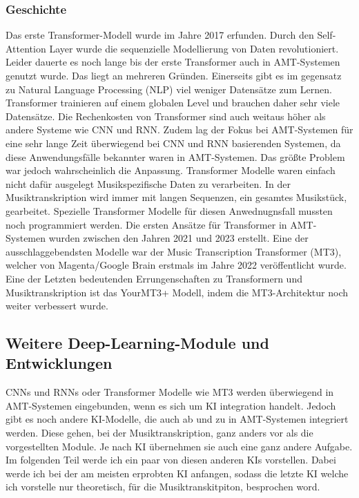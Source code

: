 \subsubsection{Geschichte}
Das erste Transformer-Modell wurde im Jahre 2017 erfunden.
\cite{vaswani2017attention}
Durch den Self-Attention Layer wurde die sequenzielle Modellierung von Daten revolutioniert.
Leider dauerte es noch lange bis der erste Transformer auch in AMT-Systemen genutzt wurde.
Das liegt an mehreren Gründen.
Einerseits gibt es im gegensatz zu Natural Language Processing (NLP) viel weniger Datensätze zum Lernen.
Transformer trainieren auf einem globalen Level und brauchen daher sehr viele Datensätze.
Die Rechenkosten von Transformer sind auch weitaus höher als andere Systeme wie CNN und RNN.
Zudem lag der Fokus bei AMT-Systemen für eine sehr lange Zeit überwiegend bei CNN und RNN basierenden Systemen,
da diese Anwendungsfälle bekannter waren in AMT-Systemen.
Das größte Problem war jedoch wahrscheinlich die Anpassung.
Transformer Modelle waren einfach nicht dafür ausgelegt Musikspezifische Daten zu verarbeiten.
In der Musiktranskription wird immer mit langen Sequenzen, ein gesamtes Musikstück, gearbeitet.
Spezielle Transformer Modelle für diesen Anwednugnsfall mussten noch programmiert werden.
Die ersten Ansätze für Transformer in AMT-Systemen wurden zwischen den Jahren 2021 und 2023 erstellt.
Eine der ausschlaggebendsten Modelle war der Music Transcription Transformer (MT3),
welcher von Magenta/Google Brain erstmals im Jahre 2022 veröffentlicht wurde.
\cite{gardner2021mt3}
Eine der Letzten bedeutenden Errungenschaften zu Transformern und Musiktranskription ist das
YourMT3+ Modell, indem die MT3-Architektur noch weiter verbessert wurde.
\cite{chang2024yourmt3}

\subsection{Weitere Deep-Learning-Module und Entwicklungen}
CNNs und RNNs oder Transformer Modelle wie MT3 werden überwiegend in AMT-Systemen eingebunden,
wenn es sich um KI integration handelt.
Jedoch gibt es noch andere KI-Modelle, die auch ab und zu in AMT-Systemen integriert werden.
Diese gehen, bei der Musiktranskription, ganz anders vor als die vorgestellten Module.
Je nach KI übernehmen sie auch eine ganz andere Aufgabe.
Im folgenden Teil werde ich ein paar von diesen anderen KIs vorstellen.
Dabei werde ich bei der am meisten erprobten KI anfangen,
sodass die letzte KI welche ich vorstelle nur theoretisch, für die Musiktranskitpiton, besprochen word.

